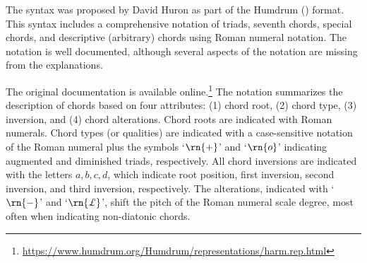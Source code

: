 The  syntax was proposed by David Huron as part
of the Humdrum () format. This syntax includes
a comprehensive notation of triads, seventh chords, special
chords, and descriptive (arbitrary) chords using Roman
numeral notation. The notation is well documented, although
several aspects of the notation are missing from the
explanations.

The original  documentation is available
online.\footnote{\href{https://www.humdrum.org/Humdrum/representations/harm.rep.html}{https://www.humdrum.org/Humdrum/representations/harm.rep.html}}
The notation summarizes the description of chords based on
four attributes: (1) chord root, (2) chord type, (3)
inversion, and (4) chord alterations. Chord roots are
indicated with Roman numerals. Chord types (or qualities)
are indicated with a case-sensitive notation of the Roman
numeral plus the symbols `$\rn{+}$' and `$\rn{o}$'
indicating augmented and diminished triads, respectively.
All chord inversions are indicated with the letters ${a, b,
c, d}$, which indicate root position, first inversion,
second inversion, and third inversion, respectively. The
alterations, indicated with `$\rn{-}$' and `$\rn{\pounds}$',
shift the pitch of the Roman numeral scale degree, most
often when indicating non-diatonic chords.
